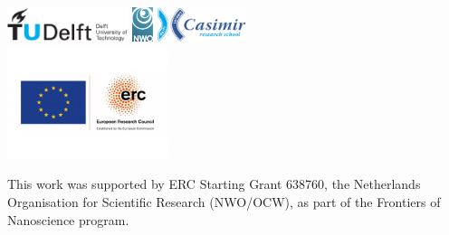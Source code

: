 \begin{titlepage}
\begin{tabular}{p{4cm}l}

\end{tabular}


\vspace{2\bigskipamount}
\begin{center}
    \includegraphics[height=0.4in]{title/logos/tudelft}
    \hspace{2em}
    \includegraphics[height=0.4in]{title/logos/nwo}
    \hspace{2em}
    \includegraphics[height=0.4in]{title/logos/casimir} \\
    \includegraphics[height=1.3in]{title/logos/erc_eu}
\end{center}

\noindent This work was supported by ERC Starting Grant 638760, the Netherlands Organisation for Scientific Research (NWO/OCW), as part of the Frontiers of Nanoscience program.
\vspace{1\bigskipamount}


\end{titlepage}
